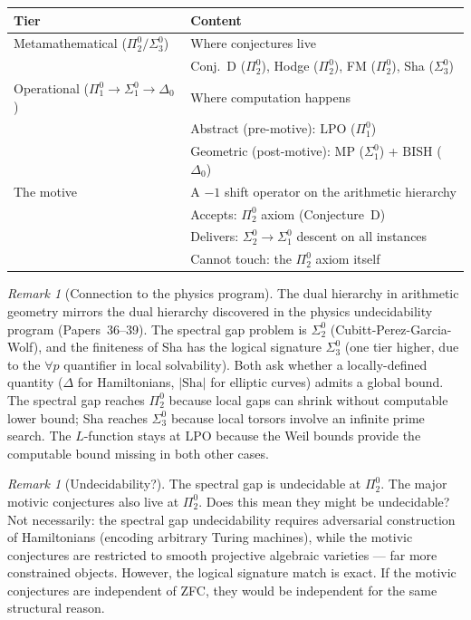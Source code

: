 \documentclass[11pt]{article}
\theoremstyle{definition}
\theoremstyle{remark}
\newtheorem{remark}[theorem]{Remark}
\newcommand{\LPO}{\mathrm{LPO}}
\newcommand{\MP}{\mathrm{MP}}
\newcommand{\BISH}{\mathrm{BISH}}
\begin{document}
\begin{center}
\small
\begin{tabular}{ll}
\toprule
\textbf{Tier} & \textbf{Content} \\
\midrule
Metamathematical ($\Pi_2^0 / \Sigma_3^0$) & Where conjectures live \\
& Conj.\ D ($\Pi_2^0$), Hodge ($\Pi_2^0$), FM ($\Pi_2^0$), Sha ($\Sigma_3^0$) \\
\midrule
Operational ($\Pi_1^0 \to \Sigma_1^0 \to \Delta_0$) & Where computation happens \\
& Abstract (pre-motive): $\LPO$ ($\Pi_1^0$) \\
& Geometric (post-motive): $\MP$ ($\Sigma_1^0$) + $\BISH$ ($\Delta_0$) \\
\midrule
The motive & A $-1$ shift operator on the arithmetic hierarchy \\
& Accepts: $\Pi_2^0$ axiom (Conjecture~D) \\
& Delivers: $\Sigma_2^0 \to \Sigma_1^0$ descent on all instances \\
& Cannot touch: the $\Pi_2^0$ axiom itself \\
\bottomrule
\end{tabular}
\end{center}

\begin{remark}[Connection to the physics program]
The dual hierarchy in arithmetic geometry mirrors the dual hierarchy discovered in the physics undecidability program (Papers~36--39). The spectral gap problem is $\Sigma_2^0$ (Cubitt-Perez-Garcia-Wolf), and the finiteness of Sha has the logical signature $\Sigma_3^0$ (one tier higher, due to the $\forall p$ quantifier in local solvability). Both ask whether a locally-defined quantity ($\Delta$ for Hamiltonians, $|\text{Sha}|$ for elliptic curves) admits a global bound. The spectral gap reaches $\Pi_2^0$ because local gaps can shrink without computable lower bound; Sha reaches $\Sigma_3^0$ because local torsors involve an infinite prime search. The $L$-function stays at $\LPO$ because the Weil bounds provide the computable bound missing in both other cases.
\end{remark}

\begin{remark}[Undecidability?]
The spectral gap is undecidable at $\Pi_2^0$. The major motivic conjectures also live at $\Pi_2^0$. Does this mean they might be undecidable? Not necessarily: the spectral gap undecidability requires adversarial construction of Hamiltonians (encoding arbitrary Turing machines), while the motivic conjectures are restricted to smooth projective algebraic varieties --- far more constrained objects. However, the logical signature match is exact. If the motivic conjectures are independent of ZFC, they would be independent for the same structural reason.
\end{remark}
\end{document}
